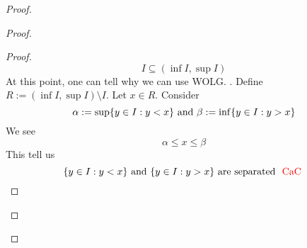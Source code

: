 \documentclass{report}
\begin{document}
\begin{proof}
\begin{proof}
\begin{proof}
\begin{equation*}
I\subseteq (\inf I,\sup I)
\end{equation*}
At this point, one can tell why we can use WOLG. . Define $R:=(\inf I,\sup I)\setminus I$. Let $x\in R$. Consider 
\begin{equation*}
\alpha :=\sup \{ y\in I:y<x \}\text{ and }\beta :=\inf \{ y \in I:y>x \}
\end{equation*}
We see 
\begin{equation*}
\alpha \leq x\leq \beta 
\end{equation*}
This tell us 
\begin{equation*}
\{ y\in I:y<x \}\text{ and }\{ y\in I:y>x \}\text{ are separated }\text{ \textcolor{red}{CaC} }
\end{equation*}


\end{proof}

\end{proof}
\end{proof}
\end{document}
